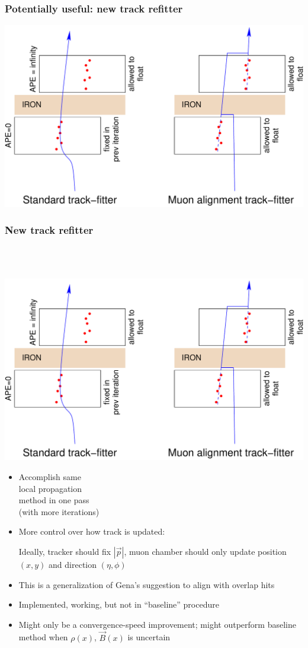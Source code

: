 \documentclass[compress]{beamer}
\begin{document}
\begin{frame}
\frametitle{Potentially useful: new track refitter}
\includegraphics[width=\linewidth]{newtrackfitter.pdf}
\end{frame}

\begin{frame}
\frametitle{New track refitter}
\mbox{ }

\vspace{-1.5 cm}
\mbox{ } \hfill \includegraphics[width=0.5\linewidth]{newtrackfitter.pdf}

\vspace{-2 cm}
\begin{itemize}\setlength{\itemsep}{0.2 cm}
\item Accomplish same \\ local propagation \\ method in one pass \\ (with more iterations)

\item More control over how track is updated:

\vspace{0.1 cm}
Ideally, tracker should fix $|\vec{p}|$, muon chamber should
only update position $(x,y)$ and direction $(\eta,\phi)$

\item This is a generalization of Gena's suggestion to align with overlap hits

\item Implemented, working, but not in ``baseline'' procedure

\item Might only be a convergence-speed improvement; might outperform
baseline method when $\rho(x)$, $\vec{B}(x)$ is uncertain
\end{itemize}
\end{frame}
\end{document}
